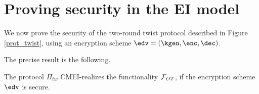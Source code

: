 \section{Proving security in the EI model}
We now prove the security of the two-round twist protocol described in Figure \ref{prot_twist}, using an encryption scheme $\edv=(\kgen, \enc, \dec)$.

The precise result is the following.

\begin{theorem}
    The protocol $\Pi_{tw}$ CMEI-realizes the functionality $\mathcal{F}_{OT}$, if the encryption scheme $\edv$ is \indcpa secure.
\end{theorem}
